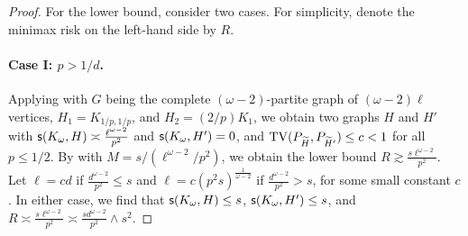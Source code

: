 \begin{proof}
For the lower bound, consider two cases. For simplicity, denote the minimax risk on the left-hand side by $R$.
\paragraph{Case I: $ p > 1/d $.}
Applying  with 
$G$ being the complete $(\omega-2)$-partite graph of $(\omega-2)\ell$ vertices, 
$ H_1 = K_{1/p, 1/p} $, and $ H_2 = (2/p)K_1 $, we obtain two graphs $ H $ and $ H' $ with $ \mathsf{s}(K_{\omega}, H) \asymp \frac{\ell^{\omega-2}}{p^2} $ and $\mathsf{s}(K_{\omega}, H')=0$, and ${\rm TV}(P_{{\widetilde{H}}}, P_{{\widetilde{H}}'}) \leq c < 1 $ for all $p \leq 1/2$.
By  with $M=s/(\ell^{\omega-2}/p^2)$, we obtain the lower bound $ R \gtrsim \frac{s\ell^{\omega-2}}{p^2} $. Let $ \ell = cd $ if $ \frac{d^{\omega-2}}{p^2} \leq s $ and $ \ell = c(p^2s)^{\frac{1}{\omega-2}} $ if $ \frac{d^{\omega-2}}{p^2} > s $, for some small constant $ c $. In either case, we find that $\mathsf{s}(K_{\omega}, H) \leq s $, $ \mathsf{s}(K_{\omega}, H') \leq s $, and $ R \asymp \frac{s\ell^{\omega-2}}{p^2} \asymp \frac{s d^{\omega-2}}{p^2} \wedge s^2 $.


\end{proof}
